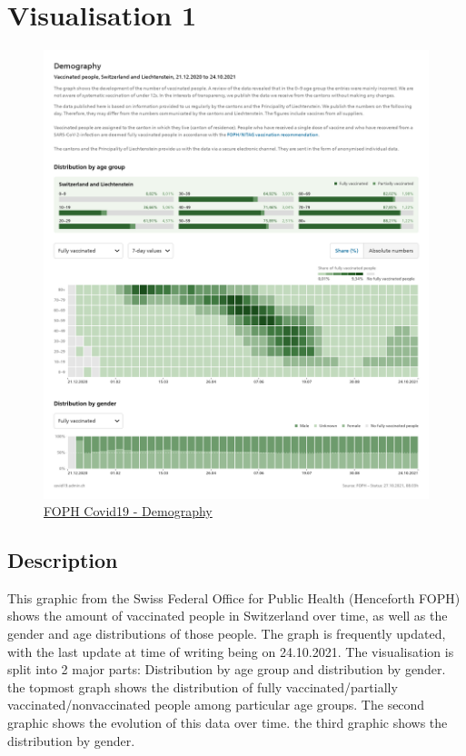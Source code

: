 \documentclass[12pt, letterpaper]{article}
\begin{document}


\newpage
\tableofcontents
\newpage
\listoffigures
\newpage

\section{Visualisation 1}
\begin{figure}[h]
    \centering
    \includegraphics[width=410pt]{images/vis1_3.png}
    \caption{\href{https://www.covid19.admin.ch/en/vaccination/persons}{FOPH Covid19 - Demography}}
    \label{fig:my_label}
\end{figure}
\newpage

\subsection{Description}
This graphic from the Swiss Federal Office for Public Health (Henceforth FOPH) shows the amount of vaccinated people in Switzerland over time, as well as the gender and age distributions of those people. The graph is frequently updated, with the last update at time of writing being on 24.10.2021. The visualisation is split into 2 major parts: Distribution by age group and distribution by gender. the topmost graph shows the distribution of fully vaccinated/partially vaccinated/nonvaccinated people among particular age groups. The second graphic shows the evolution of this data over time. the third graphic shows the distribution by gender.
\end{document}

